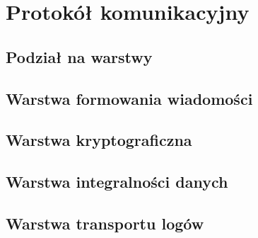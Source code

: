 \chapter{Protokół komunikacyjny}

\section[Podział na warstwy][Podział na warstwy]{Podział na warstwy}

\section[Warstwa formowania wiadomości][Warstwa formowania wiadomości]{Warstwa formowania wiadomości}

\section[Warstwa kryptograficzna][Warstwa kryptograficzna]{Warstwa kryptograficzna}

\section[Warstwa integralności][Warstwa integralności danych]{Warstwa integralności danych}

\section[Warstwa transportu logów][Warstwa transportu logów]{Warstwa transportu logów}





